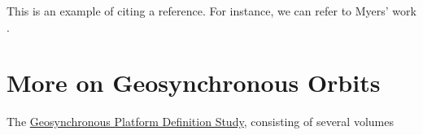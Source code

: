 \documentclass{article}
\begin{document}
This is an example of citing a reference. For instance, we can refer to Myers' work \cite{Myers1973_ExecSummary}.
% 

\section{More on Geosynchronous Orbits}
The \href{https://ntrs.nasa.gov/search?q=Geosynchronous\%20platform\%20definition\%20study&page=\%7B\%22from\%22:0,\%22size\%22:25\%7D}{Geosynchronous Platform Definition Study}, consisting of several volumes 
\cite{Myers1973_ExecSummary, Myers1973_StudySummary, Myers1973_BaselineTraffic, 
      Myers1973_PlatformSynthesis, Myers1973_TransportationRequirements, 
      Myers1973_ProgramEvaluation}

\nocite{*} %
\printbibliography
\end{document}
